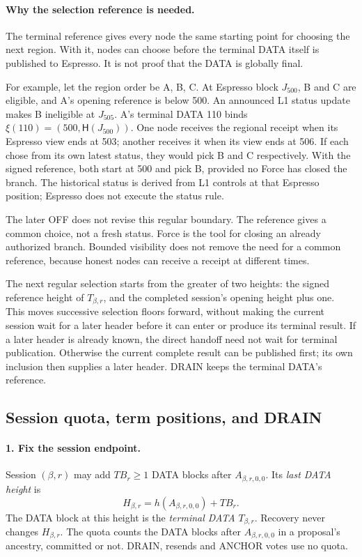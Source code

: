\documentclass[11pt,a4paper]{article}
\newcommand{\Hash}{\mathsf H}
\newcommand{\TB}{\mathit{TB}}
\newcommand{\defterm}[1]{\textcolor{rrBlue}{\textit{#1}}}
\begin{document}
\paragraph{Why the selection reference is needed.}
The terminal reference gives every node the same starting point for
choosing the next region. With it, nodes can choose before the terminal
DATA itself is published to Espresso. It is not proof that the DATA is
globally final.

For example, let the region order be A, B, C. At Espresso block $J_{500}$,
B and C are eligible, and A's opening reference is below 500. An announced
L1 status update makes B ineligible at $J_{505}$. A's terminal DATA 110
binds $\xi(110)=(500,\Hash(J_{500}))$. One node receives the regional
receipt when its Espresso view ends at 503; another receives it when its
view ends at 506. If each chose from its own latest status, they would
pick B and C respectively. With the signed reference, both start at 500
and pick B, provided no Force has closed the branch. The historical
status is derived from L1 controls at that Espresso position; Espresso
does not execute the status rule.

The later OFF does not revise this regular boundary. The reference gives
a common choice, not a fresh status. Force is the tool for closing an
already authorized branch. Bounded visibility does not remove the need
for a common reference, because honest nodes can receive a receipt at
different times.

The next regular selection starts from the greater of two heights: the
signed reference height of $T_{\beta,r}$, and the completed session's
opening height plus one. This moves successive selection floors forward,
without making the current session wait for a later header before it can
enter or produce its terminal result. If a later header is already known,
the direct handoff need not wait for terminal publication. Otherwise the
current complete result can be published first; its own inclusion then
supplies a later header. DRAIN keeps the terminal DATA's reference.

\subsection{Session quota, term positions, and DRAIN}
\label{sec:quota}
\paragraph{1. Fix the session endpoint.}
Session $(\beta,r)$ may add $\TB_r\ge1$ DATA blocks after
$A_{\beta,r,0,0}$. Its \defterm{last DATA height} is
\[
 H_{\beta,r}=h(A_{\beta,r,0,0})+\TB_r.
\]
The DATA block at this height is the \defterm{terminal DATA}
$T_{\beta,r}$. Recovery never changes $H_{\beta,r}$. The quota counts the
DATA blocks after $A_{\beta,r,0,0}$ in a proposal's ancestry, committed
or not. DRAIN, resends and ANCHOR votes use no quota.
\end{document}
